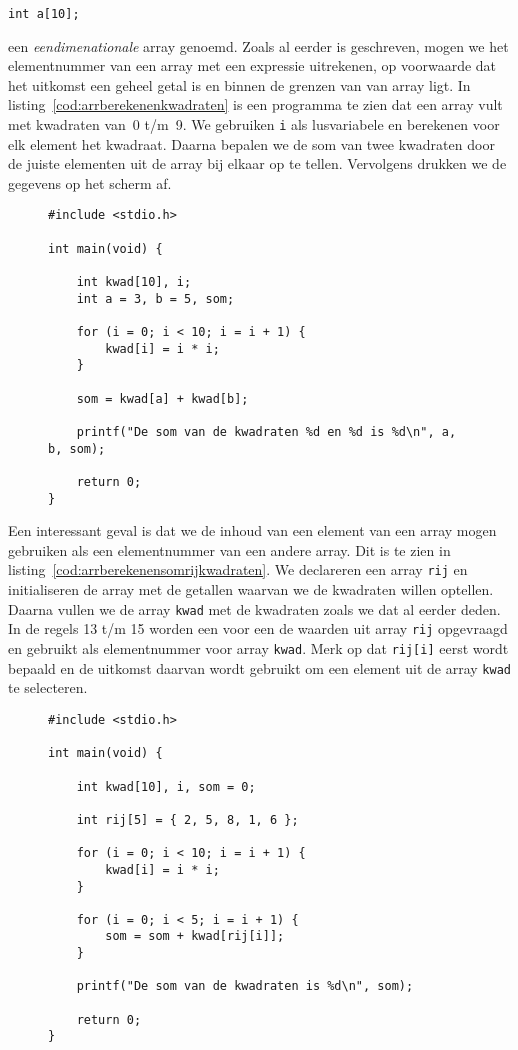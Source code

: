 \hspace*{1em}\texttt{int a[10];}

een \textsl{eendimenationale} array genoemd.
Zoals al eerder is geschreven, mogen we het elementnummer van een array met een expressie uitrekenen, op voorwaarde dat het uitkomst een geheel getal is en binnen de grenzen van van array ligt. In listing~\ref{cod:arrberekenenkwadraten} is een programma te zien dat een array vult met kwadraten van~0 t/m~9. We gebruiken \texttt{i} als lusvariabele en berekenen voor elk element het kwadraat. Daarna bepalen we de som van twee kwadraten door de juiste elementen uit de array bij elkaar op te tellen. Vervolgens drukken we de gegevens op het scherm af.

\begin{figure}[!ht]
\begin{lstlisting}[caption=Afdrukken van de som van twee kwadraten kwadraten.,label=cod:arrberekenenkwadraten]
#include <stdio.h>

int main(void) {

    int kwad[10], i;
    int a = 3, b = 5, som;

    for (i = 0; i < 10; i = i + 1) {
        kwad[i] = i * i;
    }

    som = kwad[a] + kwad[b];

    printf("De som van de kwadraten %d en %d is %d\n", a, b, som);

    return 0;
}
\end{lstlisting}
\end{figure}

Een interessant geval is dat we de inhoud van een element van een array mogen gebruiken als een elementnummer van een andere array. Dit is te zien in listing~\ref{cod:arrberekenensomrijkwadraten}. We declareren een array \texttt{rij} en initialiseren de array met de getallen waarvan we de kwadraten willen optellen. Daarna vullen we de array \texttt{kwad} met de kwadraten zoals we dat al eerder deden. In de regels 13 t/m 15 worden een voor een de waarden uit array \texttt{rij} opgevraagd en gebruikt als elementnummer voor array \texttt{kwad}. Merk op dat \texttt{rij[i]} eerst wordt bepaald en de uitkomst daarvan wordt gebruikt om een element uit de array \texttt{kwad} te selecteren.

\begin{figure}[!ht]
\begin{lstlisting}[caption=Afdrukken van de som van twee kwadraten kwadraten.,label=cod:arrberekenensomrijkwadraten]
#include <stdio.h>

int main(void) {
 
    int kwad[10], i, som = 0;

    int rij[5] = { 2, 5, 8, 1, 6 };

    for (i = 0; i < 10; i = i + 1) {
        kwad[i] = i * i;
    }

    for (i = 0; i < 5; i = i + 1) {
        som = som + kwad[rij[i]];
    }

    printf("De som van de kwadraten is %d\n", som);

    return 0;
}
\end{lstlisting}
\end{figure}

